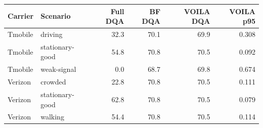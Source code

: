 \begin{tabular}{llrrrr}
\toprule
Carrier & Scenario & Full DQA & BF DQA & VOILA DQA & VOILA p95 \\
\midrule
Tmobile & driving & 32.3 & 70.1 & 69.9 & 0.308 \\
Tmobile & stationary-good & 54.8 & 70.8 & 70.5 & 0.092 \\
Tmobile & weak-signal & 0.0 & 68.7 & 69.8 & 0.674 \\
Verizon & crowded & 22.8 & 70.8 & 70.5 & 0.111 \\
Verizon & stationary-good & 62.8 & 70.8 & 70.5 & 0.079 \\
Verizon & walking & 54.4 & 70.8 & 70.5 & 0.114 \\
\bottomrule
\end{tabular}
